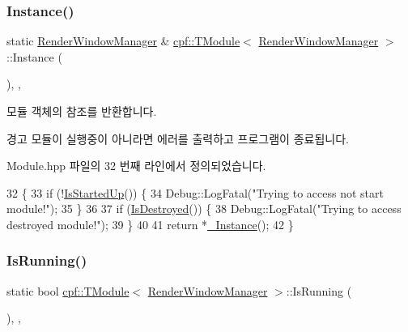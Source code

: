 \subsubsection{\texorpdfstring{Instance()}{Instance()}}
{\footnotesize\ttfamily static \hyperlink{classcpf_1_1_render_window_manager}{Render\+Window\+Manager} \& \hyperlink{classcpf_1_1_t_module}{cpf\+::\+T\+Module}$<$ \hyperlink{classcpf_1_1_render_window_manager}{Render\+Window\+Manager}  $>$\+::Instance (\begin{DoxyParamCaption}{ }\end{DoxyParamCaption})\hspace{0.3cm}{\ttfamily [inline]}, {\ttfamily [static]}, {\ttfamily [inherited]}}

모듈 객체의 참조를 반환합니다. \begin{DoxyWarning}{경고}
모듈이 실행중이 아니라면 에러를 출력하고 프로그램이 종료됩니다. 
\end{DoxyWarning}


Module.\+hpp 파일의 32 번째 라인에서 정의되었습니다.


\begin{DoxyCode}
32                              \{
33             \textcolor{keywordflow}{if} (!\hyperlink{classcpf_1_1_t_module_a73732afee7131dad652bf3e00c75cef9}{IsStartedUp}()) \{
34                 Debug::LogFatal(\textcolor{stringliteral}{"Trying to access not start module!"});
35             \}
36 
37             \textcolor{keywordflow}{if} (\hyperlink{classcpf_1_1_t_module_a9f70f0a70ac59b13b7a874f82c877337}{IsDestroyed}()) \{
38                 Debug::LogFatal(\textcolor{stringliteral}{"Trying to access destroyed module!"});
39             \}
40 
41             \textcolor{keywordflow}{return} *\hyperlink{classcpf_1_1_t_module_a06ab8af8ea6b294959937fd2bbc1e615}{\_Instance}();
42         \}
\end{DoxyCode}
\mbox{\label{classcpf_1_1_t_module_acd38943803d522ba6dcf7f0871b2f502}} 
\subsubsection{\texorpdfstring{Is\+Running()}{IsRunning()}}
{\footnotesize\ttfamily static bool \hyperlink{classcpf_1_1_t_module}{cpf\+::\+T\+Module}$<$ \hyperlink{classcpf_1_1_render_window_manager}{Render\+Window\+Manager}  $>$\+::Is\+Running (\begin{DoxyParamCaption}{ }\end{DoxyParamCaption})\hspace{0.3cm}{\ttfamily [inline]}, {\ttfamily [static]}, {\ttfamily [inherited]}}


